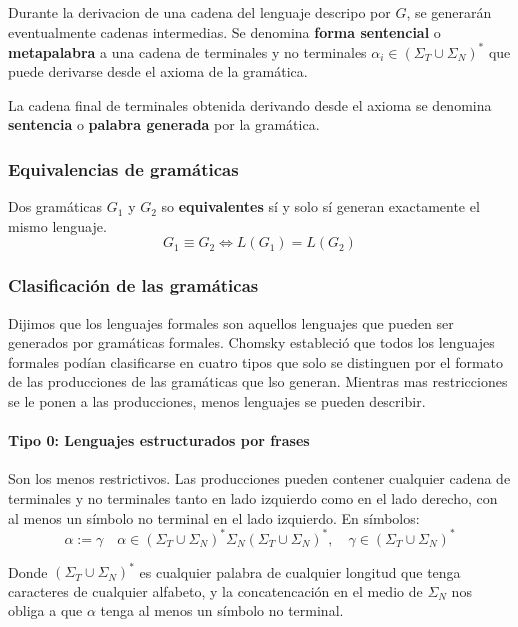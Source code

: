\documentclass[12pt]{article}
\begin{document}
Durante la derivacion de una cadena del lenguaje descripo por $ G $, se generarán eventualmente cadenas intermedias. Se denomina \textbf{forma sentencial} o \textbf{metapalabra} a una cadena de terminales y no terminales $ \alpha_{i}\in \left(\Sigma_{T}\cup \Sigma_{N}\right)^{*} $ que puede derivarse desde el axioma de la gramática.

La cadena final de terminales obtenida derivando desde el axioma se denomina \textbf{sentencia} o \textbf{palabra generada} por la gramática.

\subsubsection{Equivalencias de gramáticas}
Dos gramáticas $ G_{1} $ y $ G_{2} $ so \textbf{equivalentes} sí y solo sí generan exactamente el mismo lenguaje.
\[
G_{1} \equiv G_{2} \iff L(G_{1}) = L(G_{2})
\]

\subsubsection{Clasificación de las gramáticas}
Dijimos que los lenguajes formales son aquellos lenguajes que pueden ser generados por gramáticas formales. Chomsky estableció que todos los lenguajes formales podían clasificarse en cuatro tipos que solo se distinguen por el formato de las producciones de las gramáticas que lso generan. Mientras mas restricciones se le ponen a las producciones, menos lenguajes se pueden describir.

\paragraph{Tipo 0: Lenguajes estructurados por frases}\mbox{}

Son los menos restrictivos. Las producciones pueden contener cualquier cadena de terminales y no terminales tanto en lado izquierdo como en el lado derecho, con al menos un símbolo no terminal en el lado izquierdo. En símbolos:
\[
\alpha := \gamma \quad \alpha \in \left(\Sigma_{T} \cup \Sigma_{N}\right)^{*} \Sigma_{N} \left(\Sigma_{T} \cup \Sigma_{N}\right)^{*}, \quad \gamma \in \left(\Sigma_{T} \cup \Sigma_{N}\right)^{*}
\]

Donde $ \left(\Sigma_{T} \cup \Sigma_{N}\right)^{*} $ es cualquier palabra de cualquier longitud que tenga caracteres de cualquier alfabeto, y la concatencación en el medio de $ \Sigma_{N} $ nos obliga a que $ \alpha $ tenga al menos un símbolo no terminal.
\end{document}
